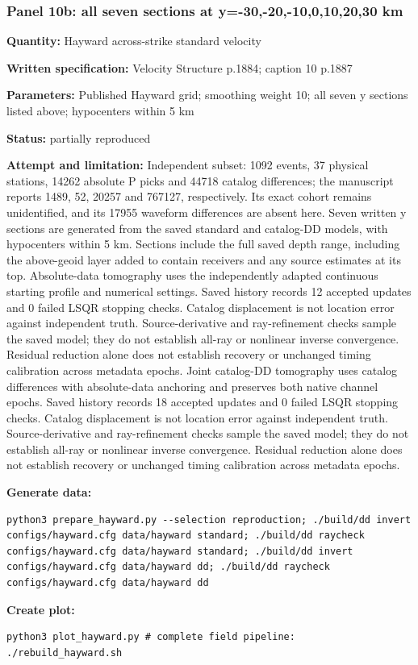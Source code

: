 \subsubsection*{Panel 10b: all seven sections at y=-30,-20,-10,0,10,20,30 km}
\noindent\textbf{Quantity:} Hayward across-strike standard velocity\par
\noindent\textbf{Written specification:} Velocity Structure p.1884; caption 10 p.1887\par
\noindent\textbf{Parameters:} Published Hayward grid; smoothing weight 10; all seven y sections listed above; hypocenters within 5 km\par
\noindent\textbf{Status:} partially reproduced\par
\noindent\textbf{Attempt and limitation:} Independent subset: 1092 events, 37 physical stations, 14262 absolute P picks and 44718 catalog differences; the manuscript reports 1489, 52, 20257 and 767127, respectively. Its exact cohort remains unidentified, and its 17955 waveform differences are absent here. Seven written y sections are generated from the saved standard and catalog-DD models, with hypocenters within 5 km. Sections include the full saved depth range, including the above-geoid layer added to contain receivers and any source estimates at its top. Absolute-data tomography uses the independently adapted continuous starting profile and numerical settings. Saved history records 12 accepted updates and 0 failed LSQR stopping checks. Catalog displacement is not location error against independent truth. Source-derivative and ray-refinement checks sample the saved model; they do not establish all-ray or nonlinear inverse convergence. Residual reduction alone does not establish recovery or unchanged timing calibration across metadata epochs. Joint catalog-DD tomography uses catalog differences with absolute-data anchoring and preserves both native channel epochs. Saved history records 18 accepted updates and 0 failed LSQR stopping checks. Catalog displacement is not location error against independent truth. Source-derivative and ray-refinement checks sample the saved model; they do not establish all-ray or nonlinear inverse convergence. Residual reduction alone does not establish recovery or unchanged timing calibration across metadata epochs.\par
\noindent\textbf{Generate data:}
\begin{lstlisting}
python3 prepare_hayward.py --selection reproduction; ./build/dd invert configs/hayward.cfg data/hayward standard; ./build/dd raycheck configs/hayward.cfg data/hayward standard; ./build/dd invert configs/hayward.cfg data/hayward dd; ./build/dd raycheck configs/hayward.cfg data/hayward dd
\end{lstlisting}
\noindent\textbf{Create plot:}
\begin{lstlisting}
python3 plot_hayward.py # complete field pipeline: ./rebuild_hayward.sh
\end{lstlisting}
